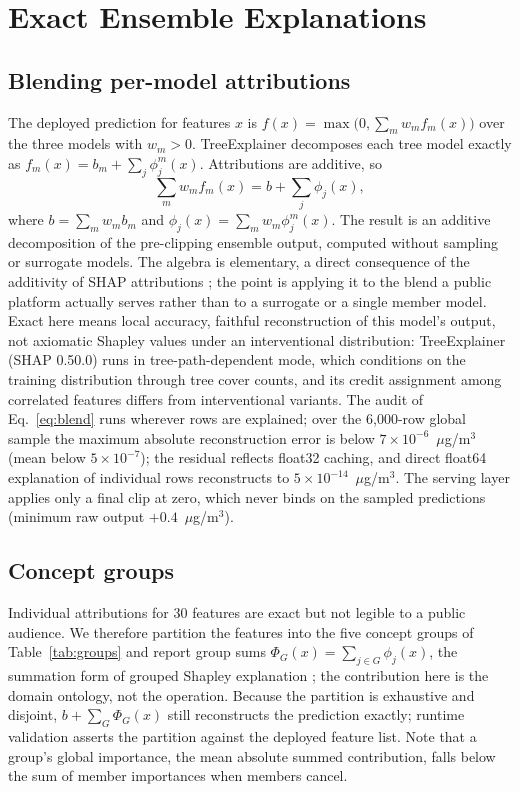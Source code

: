 \documentclass[conference]{IEEEtran}
\newcommand{\ugm}{$\mu$g/m$^3$}
\begin{document}
\section{Exact Ensemble Explanations}
\subsection{Blending per-model attributions}
The deployed prediction for features $x$ is
$f(x)=\max\bigl(0,\sum_m w_m f_m(x)\bigr)$ over the three models with
$w_m>0$. TreeExplainer \cite{lundberg2020} decomposes each tree model
exactly as $f_m(x)=b_m+\sum_j \phi^m_j(x)$. Attributions are additive, so
\begin{equation}
\sum_m w_m f_m(x) = b + \sum_j \phi_j(x),
\label{eq:blend}
\end{equation}
where $b=\sum_m w_m b_m$ and $\phi_j(x)=\sum_m w_m \phi^m_j(x)$. The
result is an additive decomposition of the pre-clipping ensemble output,
computed without sampling or surrogate models. The algebra is elementary, a direct
consequence of the additivity of SHAP attributions \cite{lundberg2017}; the
point is applying it to the blend a public platform actually serves rather
than to a surrogate or a single member model. Exact here means local
accuracy,
faithful reconstruction of this model's output, not axiomatic Shapley
values under an interventional distribution: TreeExplainer (SHAP 0.50.0)
runs in tree-path-dependent mode, which conditions on the training
distribution through tree cover counts, and its credit assignment among
correlated features differs from interventional variants. The audit of
Eq.~\eqref{eq:blend} runs wherever rows are explained; over the 6,000-row
global sample the maximum absolute reconstruction error is below
$7\times10^{-6}$~\ugm{} (mean below $5\times10^{-7}$); the residual
reflects float32 caching, and direct float64 explanation of individual
rows reconstructs to $5\times10^{-14}$~\ugm{}. The serving layer applies only a
final clip at zero, which never binds on the sampled predictions (minimum
raw output $+0.4$~\ugm{}).

\subsection{Concept groups}
Individual attributions for 30 features are exact but not legible to a
public audience. We therefore partition the features into the five concept
groups of Table~\ref{tab:groups} and report group sums
$\Phi_G(x)=\sum_{j\in G}\phi_j(x)$, the summation form of grouped Shapley
explanation \cite{jullum2021}; the contribution here is the domain
ontology, not the operation. Because the partition is exhaustive and
disjoint, $b+\sum_G \Phi_G(x)$ still reconstructs the prediction exactly;
runtime validation asserts the partition against the deployed feature list.
Note that a group's global importance, the mean absolute summed
contribution, falls below the sum of member importances when members
cancel.
\end{document}
